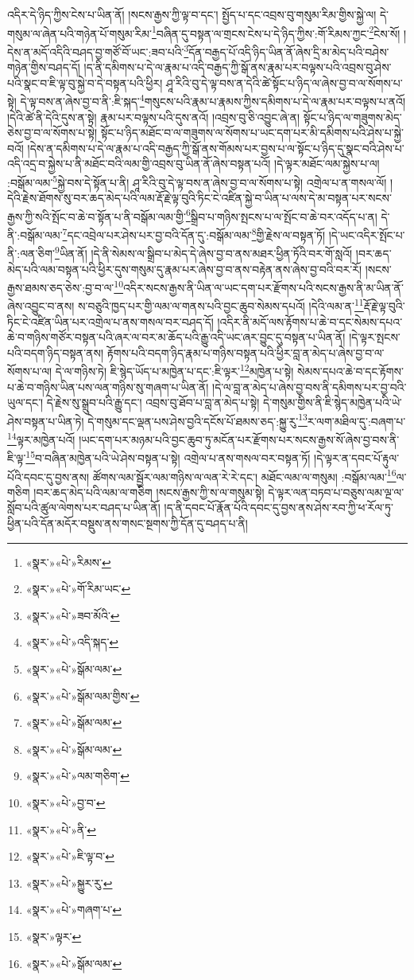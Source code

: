 འདིར་དེ་ཉིད་ཀྱིས་ངེས་པ་ཡིན་ནོ། །སངས་རྒྱས་ཀྱི་ལྟ་བ་དང་། སྤྱོད་པ་དང་འབྲས་བུ་གསུམ་རིམ་གྱིས་སྐྱེ་ལ། དེ་གསུམ་ལ་ཞེན་པའི་གཉེན་པོ་གསུམ་རིམ་\footnote{«སྣར་»«པེ་»རིམས་}བཞིན་དུ་བསྟན་ལ་གྲངས་ངེས་པ་དེ་ཉིད་ཀྱིས་:གོ་རིམས་ཀྱང་\footnote{«སྣར་»«པེ་»གོ་རིམ་ཡང་}ངེས་སོ། །དེས་ན་མདོ་འདིའི་བཤད་བྱ་གཙོ་བོ་ཡང་:ཟབ་པའི་\footnote{«སྣར་»«པེ་»ཟབ་མོའི་}དོན་བརྒྱད་པོ་འདི་ཉིད་ཡིན་ནོ་ཞེས་དྲི་མ་མེད་པའི་བཤེས་གཉེན་གྱིས་བཤད་དོ། །ད་ནི་དམིགས་པ་དེ་ལ་རྣམ་པ་འདི་བརྒྱད་ཀྱི་སྒོ་ནས་རྣམ་པར་བལྟས་པའི་འབྲས་བུ་ཤེས་པའི་སྣང་བ་ཇི་ལྟ་བུ་སྐྱེ་བ་དེ་བསྟན་པའི་ཕྱིར། ཤཱ་རིའི་བུ་དེ་ལྟ་བས་ན་དེའི་ཚེ་སྟོང་པ་ཉིད་ལ་ཞེས་བྱ་བ་ལ་སོགས་པ་སྟེ། དེ་ལྟ་བས་ན་ཞེས་བྱ་བ་ནི་:ཇི་སྐད་\footnote{«སྣར་»«པེ་»འདི་སྐད་}གསུངས་པའི་རྣམ་པ་རྣམས་ཀྱིས་དམིགས་པ་དེ་ལ་རྣམ་པར་བལྟས་པ་ནའོ། །དེའི་ཚེ་ནི་དེའི་དུས་ན་སྟེ། རྣམ་པར་བལྟས་པའི་དུས་ནའོ། །འབྲས་བུ་ཅི་འབྱུང་ཞེ་ན། སྟོང་པ་ཉིད་ལ་གཟུགས་མེད་ཅེས་བྱ་བ་ལ་སོགས་པ་སྟེ། སྟོང་པ་ཉིད་མཐོང་བ་ལ་གཟུགས་ལ་སོགས་པ་ཡང་དག་པར་མི་དམིགས་པའི་ཤེས་པ་སྐྱེ་བའོ། །དེས་ན་དམིགས་པ་དེ་ལ་རྣམ་པ་འདི་བརྒྱད་ཀྱི་སྒོ་ནས་གོམས་པར་བྱས་པ་ལ་སྟོང་པ་ཉིད་དུ་སྣང་བའི་ཤེས་པ་འདི་འདྲ་བ་སྐྱེས་པ་ནི་མཐོང་བའི་ལམ་གྱི་འབྲས་བུ་ཡིན་ནོ་ཞེས་བསྟན་པའོ། །དེ་ལྟར་མཐོང་ལམ་སྐྱེས་པ་ལ། :བསྒོམ་ལམ་\footnote{«སྣར་»«པེ་»སྒོམ་ལམ་}སྐྱེ་བས་དེ་སྟོན་པ་ནི། ཤཱ་རིའི་བུ་དེ་ལྟ་བས་ན་ཞེས་བྱ་བ་ལ་སོགས་པ་སྟེ། འགྲེལ་པ་ན་གསལ་ལོ། །དེའི་རྗེས་ཐོགས་སུ་བར་ཆད་མེད་པའི་ལམ་རྡོ་རྗེ་ལྟ་བུའི་ཏིང་ངེ་འཛིན་སྐྱེ་བ་ཡིན་པ་ལས་དེ་མ་བསྟན་པར་སངས་རྒྱས་ཀྱི་སའི་སྤོང་བ་ཆེ་བ་སྟོན་པ་ནི་བསྒོམ་ལམ་གྱི་\footnote{«སྣར་»«པེ་»སྒོམ་ལམ་གྱིས་}སྒྲིབ་པ་གཉིས་སྤངས་པ་ལ་སྤོང་བ་ཆེ་བར་འདོད་པ་ན། དེ་ནི་:བསྒོམ་ལམ་\footnote{«སྣར་»«པེ་»སྒོམ་ལམ་}དང་འབྲེལ་པར་ཤེས་པར་བྱ་བའི་དོན་དུ་:བསྒོམ་ལམ་\footnote{«སྣར་»«པེ་»སྒོམ་ལམ་}གྱི་རྗེས་ལ་བསྟན་ཏོ། །དེ་ཡང་འདིར་སྤོང་པ་ནི་:ལན་ཅིག་\footnote{«སྣར་»«པེ་»ལམ་གཅིག་}ཡིན་ནོ། །དེ་ནི་སེམས་ལ་སྒྲིབ་པ་མེད་དེ་ཞེས་བྱ་བ་ནས་མཐར་ཕྱིན་ཏོའི་བར་གོ་སླའོ། །བར་ཆད་མེད་པའི་ལམ་བསྟན་པའི་ཕྱིར་དུས་གསུམ་དུ་རྣམ་པར་ཞེས་བྱ་བ་ནས་བརྟེན་ནས་ཞེས་བྱ་བའི་བར་རོ། །སངས་རྒྱས་ཐམས་ཅད་ཅེས་:བྱ་བ་ལ་\footnote{«སྣར་»«པེ་»བྱ་བ་}འདིར་སངས་རྒྱས་ནི་ཡིན་ལ་ཡང་དག་པར་རྫོགས་པའི་སངས་རྒྱས་ནི་མ་ཡིན་ནོ་ཞེས་འབྱུང་བ་ནས། ས་བཅུའི་ཁྱད་པར་གྱི་ལམ་ལ་གནས་པའི་བྱང་ཆུབ་སེམས་དཔའོ། །དེའི་ལམ་ན་\footnote{«སྣར་»«པེ་»ནི་}རྡོ་རྗེ་ལྟ་བུའི་ཏིང་ངེ་འཛིན་ཡིན་པར་འགྲེལ་པ་ནས་གསལ་བར་བཤད་དོ། །འདིར་ནི་མདོ་ལས་རྟོགས་པ་ཆེ་བ་དང་སེམས་དཔའ་ཆེ་བ་གཉིས་གཙོར་བསྟན་པའི་ཞར་ལ་བར་མ་ཆོད་པའི་རྒྱུ་འདི་ཡང་ཞར་བྱུང་དུ་བསྟན་པ་ཡིན་ནོ། །དེ་ལྟར་སྤངས་པའི་བདག་ཉིད་བསྟན་ནས། རྟོགས་པའི་བདག་ཉིད་རྣམ་པ་གཉིས་བསྟན་པའི་ཕྱིར་བླ་ན་མེད་པ་ཞེས་བྱ་བ་ལ་སོགས་པ་ལ། དེ་ལ་གཉིས་ཏེ། ཇི་སྙེད་ཡོད་པ་མཁྱེན་པ་དང་:ཇི་ལྟར་\footnote{«སྣར་»«པེ་»ཇི་ལྟ་བ་}མཁྱེན་པ་སྟེ། སེམས་དཔའ་ཆེ་བ་དང་རྟོགས་པ་ཆེ་བ་གཉིས་ཡིན་པས་ལན་གཉིས་སུ་གཞག་པ་ཡིན་ནོ། །དེ་ལ་བླ་ན་མེད་པ་ཞེས་བྱ་བས་ནི་དམིགས་པར་བྱ་བའི་ཡུལ་དང་། དེ་རྗེས་སུ་སྒྲུབ་པའི་རྒྱུ་དང་། འབྲས་བུ་ཐོབ་པ་བླ་ན་མེད་པ་སྟེ། དེ་གསུམ་གྱིས་ནི་ཇི་སྙེད་མཁྱེན་པའི་ཡེ་ཤེས་བསྟན་པ་ཡིན་ཏེ། དེ་གསུམ་དང་ལྡན་པས་ཤེས་བྱའི་དངོས་པོ་ཐམས་ཅད་:སྐྱུ་རུ་\footnote{«སྣར་»«པེ་»སྐྱུར་རུ་}ར་ལག་མཐིལ་དུ་:བཞག་པ་\footnote{«སྣར་»«པེ་»གཞག་པ་}ལྟར་མཁྱེན་པའོ། །ཡང་དག་པར་མཉམ་པའི་བྱང་ཆུབ་ཏུ་མངོན་པར་རྫོགས་པར་སངས་རྒྱས་སོ་ཞེས་བྱ་བས་ནི་ཇི་ལྟ་\footnote{«སྣར་»ལྟར་}བ་བཞིན་མཁྱེན་པའི་ཡེ་ཤེས་བསྟན་པ་སྟེ། འགྲེལ་པ་ནས་གསལ་བར་བསྟན་ཏོ། །དེ་ལྟར་ན་དབང་པོ་རྟུལ་པོའི་དབང་དུ་བྱས་ནས། ཚོགས་ལམ་སྦྱོར་ལམ་གཉིས་ལ་ལན་རེ་རེ་དང་། མཐོང་ལམ་ལ་གསུམ། :བསྒོམ་ལམ་\footnote{«སྣར་»«པེ་»སྒོམ་ལམ་}ལ་གཅིག །བར་ཆད་མེད་པའི་ལམ་ལ་གཅིག །སངས་རྒྱས་ཀྱི་ས་ལ་གསུམ་སྟེ། དེ་ལྟར་ལན་བཏབ་པ་བཅུས་ལམ་ལྔ་ལ་སློབ་པའི་ཚུལ་ལེགས་པར་བཤད་པ་ཡིན་ནོ། །ད་ནི་དབང་པོ་རྣོན་པོའི་དབང་དུ་བྱས་ནས་ཤེས་རབ་ཀྱི་ཕ་རོལ་ཏུ་ཕྱིན་པའི་དོན་མདོར་བསྡུས་ནས་གསང་སྔགས་ཀྱི་དོན་དུ་བཤད་པ་ནི། 